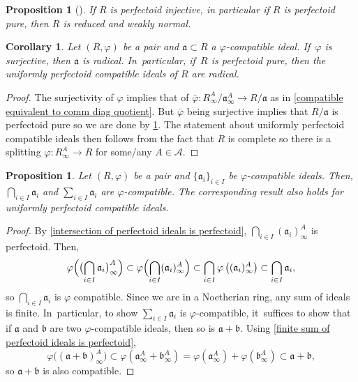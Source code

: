 \documentclass[JEP,XML,SOM,Unicode,published]{cedram}
\let\autoref\cref
\theoremstyle{plain}
\newtheorem{corollary}[theorem]{Corollary}
\newtheorem{proposition}[theorem]{Proposition}
\theoremstyle{definition}
\numberwithin{equation}{theorem}
\newcommand{\fra}{\mathfrak{a}}
\newcommand{\frab}{\mathfrak{b}}
\newcommand{\sA}{\mathcal{A}}
\renewcommand{\phi}{\varphi}
\newcommand{\rphi}{(R,\phi)}
\newcommand{\rafty}{R^A_\infty}
\newcommand{\aafty}{\fra^A_\infty}
\newcommand{\bafty}{\frab^A_\infty}
\begin{document}
\begin{proposition}[{\cite[Lem.\,4.29]{BMPSTWWPerfectoidPure}}]\label{perfectoid injective rings are reduced and WN}
If $R$ is perfectoid injective, in particular if $R$ is perfectoid pure, then $R$ is reduced and weakly normal.
\end{proposition}

\begin{corollary}\label{compatible ideals are radical}
Let $\rphi$ be a pair and $\fra\subset R$ a $\phi$-compatible ideal. If~$\phi$ is surjective, then $\fra$ is radical. In~particular, if~$R$ is perfectoid pure, then the uniformly perfectoid compatible ideals of $R$ are radical.
\end{corollary}

\begin{proof}
The surjectivity of $\phi$ implies that of $\bar{\phi}\colon \rafty/\aafty\to R/\fra$ as in \autoref{compatible equivalent to comm diag quotient}.
But $\bar{\phi}$ being surjective implies that $R/\fra$ is perfectoid pure so we are done by \autoref{perfectoid injective rings are reduced and WN}. The statement about uniformly perfectoid compatible ideals then follows from the fact that $R$ is complete so there is a splitting $\phi\colon \rafty \to R$ for some/any $A\in \sA$.
\end{proof}

\begin{proposition}\label{lemma compatible ideals closed under sums intersection}
Let $\rphi$ be a pair and $\{\fra_i\}_{i\in I}$ be $\phi$-compatible ideals. Then, $\bigcap_{i\in I} \fra_i$ and $\sum_{i\in I} \fra_i$ are $\phi$-compatible. The corresponding result also holds for uniformly perfectoid compatible ideals.
\end{proposition}

\begin{proof}
By \autoref{intersection of perfectoid ideals is perfectoid}, $\bigcap_{i\in I} (\fra_i)^A_\infty$ is perfectoid.
Then,\vspace*{-3pt}
\[\phi\Bigl(\bigl(\bigcap_{i\in I} \fra_i\bigr)^A_\infty\Bigr)\subset \phi \Bigl(\bigcap_{i\in I} (\fra_i)^A_\infty \Bigr)\subset \bigcap_{i\in I} \phi\left((\fra_i)^A_\infty\right)\subset \bigcap_{i\in I} \fra_i,
\]
so $\bigcap_{i\in I} \fra_i$ is $\phi$ compatible. Since we are in a Noetherian ring, any sum of ideals is finite. In~particular, to show $\sum_{i\in I} \fra_i$ is $\phi$-compatible, it~suffices to show that if $\fra$ and $\frab$ are two $\phi$-compatible ideals, then so is $\fra+\frab$.
Using \autoref{finite sum of perfectoid ideals is perfectoid},\vspace*{-3pt}
\[\phi \bigl((\fra+ \frab)^A_\infty \bigr)\subset\phi\left(\aafty+ \bafty\right) = \phi\left(\aafty\right)+\phi\left(\bafty\right)\subset \fra + \frab,
\]
so $\fra+\frab$ is also compatible.
\end{proof}
\end{document}
